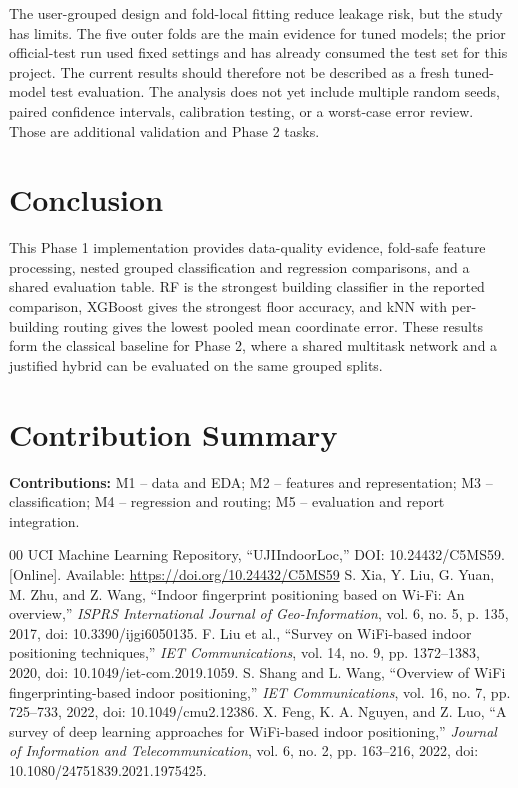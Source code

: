 \documentclass[conference]{IEEEtran}
\begin{document}
The user-grouped design and fold-local fitting reduce leakage risk, but the study has limits. The five outer folds are the main evidence for tuned models; the prior official-test run used fixed settings and has already consumed the test set for this project. The current results should therefore not be described as a fresh tuned-model test evaluation. The analysis does not yet include multiple random seeds, paired confidence intervals, calibration testing, or a worst-case error review. Those are additional validation and Phase 2 tasks.

\section{Conclusion}
This Phase 1 implementation provides data-quality evidence, fold-safe feature processing, nested grouped classification and regression comparisons, and a shared evaluation table. RF is the strongest building classifier in the reported comparison, XGBoost gives the strongest floor accuracy, and kNN with per-building routing gives the lowest pooled mean coordinate error. These results form the classical baseline for Phase 2, where a shared multitask network and a justified hybrid can be evaluated on the same grouped splits.

\section*{Contribution Summary}
\footnotesize\noindent\textbf{Contributions:} M1 -- data and EDA; M2 -- features and representation; M3 -- classification; M4 -- regression and routing; M5 -- evaluation and report integration.

\balance
\begin{thebibliography}{00}
 UCI Machine Learning Repository, \textquotedblleft UJIIndoorLoc,\textquotedblright{} DOI: 10.24432/C5MS59. [Online]. Available: \url{https://doi.org/10.24432/C5MS59}
 S. Xia, Y. Liu, G. Yuan, M. Zhu, and Z. Wang, \textquotedblleft Indoor fingerprint positioning based on Wi-Fi: An overview,\textquotedblright{} \emph{ISPRS International Journal of Geo-Information}, vol. 6, no. 5, p. 135, 2017, doi: 10.3390/ijgi6050135.
 F. Liu et al., \textquotedblleft Survey on WiFi-based indoor positioning techniques,\textquotedblright{} \emph{IET Communications}, vol. 14, no. 9, pp. 1372--1383, 2020, doi: 10.1049/iet-com.2019.1059.
 S. Shang and L. Wang, \textquotedblleft Overview of WiFi fingerprinting-based indoor positioning,\textquotedblright{} \emph{IET Communications}, vol. 16, no. 7, pp. 725--733, 2022, doi: 10.1049/cmu2.12386.
 X. Feng, K. A. Nguyen, and Z. Luo, \textquotedblleft A survey of deep learning approaches for WiFi-based indoor positioning,\textquotedblright{} \emph{Journal of Information and Telecommunication}, vol. 6, no. 2, pp. 163--216, 2022, doi: 10.1080/24751839.2021.1975425.
\end{thebibliography}
\end{document}
